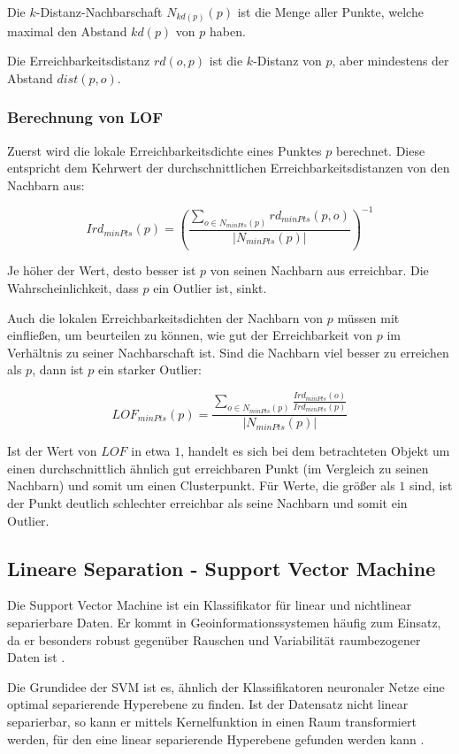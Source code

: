 \documentclass[11pt,ceqn]{book}
\begin{document}
Die $k$-Distanz-Nachbarschaft $N_{kd(p)} (p)$ ist die Menge aller Punkte, welche maximal den Abstand $kd(p)$ von $p$ haben.

Die Erreichbarkeitsdistanz $rd(o,p)$ ist die $k$-Distanz von $p$, aber mindestens der Abstand $dist(p,o)$.

\subsubsection{Berechnung von LOF}

Zuerst wird die lokale Erreichbarkeitsdichte eines Punktes $p$ berechnet. Diese entspricht dem Kehrwert der durchschnittlichen Erreichbarkeitsdistanzen von den Nachbarn aus:

$$Ird_{minPts}(p) = \left(\frac{\sum\limits_{o \in N_{minPts}(p)} rd_{minPts}(p,o)}{|N_{minPts}(p)|}\right)^{-1}$$

Je höher der Wert, desto besser ist $p$ von seinen Nachbarn aus erreichbar. Die Wahrscheinlichkeit, dass $p$ ein Outlier ist, sinkt.

Auch die lokalen Erreichbarkeitsdichten der Nachbarn von $p$ müssen mit einfließen, um beurteilen zu können, wie gut der Erreichbarkeit von $p$ im Verhältnis zu seiner Nachbarschaft ist. Sind die Nachbarn viel besser zu erreichen als $p$, dann ist $p$ ein starker Outlier:

$$LOF_{minPts}(p) = \frac{\sum\limits_{o \in N_{minPts}(p)}\frac{Ird_{minPts}(o)}{Ird_{minPts}(p)}}{|N_{minPts}(p)|}$$

Ist der Wert von $LOF$ in etwa $1$, handelt es sich bei dem betrachteten Objekt um einen durchschnittlich ähnlich gut erreichbaren Punkt (im Vergleich zu seinen Nachbarn) und somit um einen Clusterpunkt. Für Werte, die größer als $1$ sind, ist der Punkt deutlich schlechter erreichbar als seine Nachbarn und somit ein Outlier.

\subsection{Lineare Separation - Support Vector Machine}
Die Support Vector Machine ist ein Klassifikator für linear und nichtlinear separierbare Daten. Er kommt in Geoinformationssystemen häufig zum Einsatz, da er besonders robust gegenüber Rauschen und Variabilität raumbezogener Daten ist \cite{svmingeo}.

Die Grundidee der SVM ist es, ähnlich der Klassifikatoren neuronaler Netze eine optimal separierende Hyperebene zu finden. Ist der Datensatz nicht linear separierbar, so kann er mittels Kernelfunktion in einen Raum transformiert werden, für den eine linear separierende Hyperebene gefunden werden kann \cite{svm}. \\
\end{document}
